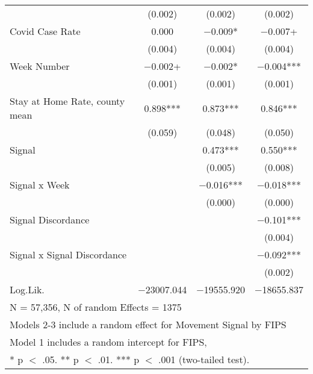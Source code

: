 \begin{table}[!h]
\begin{tabular}[t]{lccc}
 & (\num{0.002}) & (\num{0.002}) & (\num{0.002})\\
Covid Case Rate & \num{0.000} & \num{-0.009}* & \num{-0.007}+\\
 & (\num{0.004}) & (\num{0.004}) & (\num{0.004})\\
Week Number & \num{-0.002}+ & \num{-0.002}* & \num{-0.004}***\\
 & (\num{0.001}) & (\num{0.001}) & (\num{0.001})\\
Stay at Home Rate, county mean & \num{0.898}*** & \num{0.873}*** & \num{0.846}***\\
 & (\num{0.059}) & (\num{0.048}) & (\num{0.050})\\
Signal &  & \num{0.473}*** & \num{0.550}***\\
 &  & (\num{0.005}) & (\num{0.008})\\
Signal x Week &  & \num{-0.016}*** & \num{-0.018}***\\
 &  & (\num{0.000}) & (\num{0.000})\\
Signal Discordance &  &  & \num{-0.101}***\\
 &  &  & (\num{0.004})\\
Signal x Signal Discordance &  &  & \num{-0.092}***\\
 &  &  & (\num{0.002})\\
\midrule
Log.Lik. & \num{-23007.044} & \num{-19555.920} & \num{-18655.837}\\
\bottomrule
\multicolumn{4}{l}{\rule{0pt}{1em}N = 57,356, N of random Effects = 1375}\\
\multicolumn{4}{l}{\rule{0pt}{1em}Models 2-3 include a random effect for Movement Signal by FIPS}\\
\multicolumn{4}{l}{\rule{0pt}{1em}Model 1 includes a random intercept for FIPS,}\\
\multicolumn{4}{l}{\rule{0pt}{1em}* p $<$ .05. ** p $<$ .01. *** p $<$ .001 (two-tailed test).}\\
\end{tabular}
\end{table}

